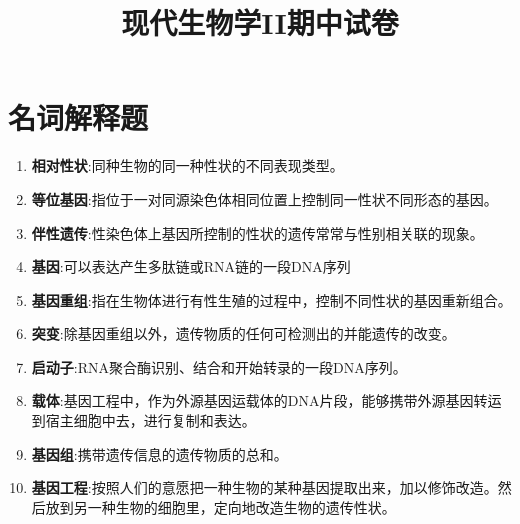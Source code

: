 \documentclass[UTF8]{article}
\title{现代生物学II期中试卷}
\begin{document}
    \maketitle
    \section{名词解释题}
    \begin{enumerate}
        \item \textbf{相对性状}:同种生物的同一种性状的不同表现类型。
        \item \textbf{等位基因}:指位于一对同源染色体相同位置上控制同一性状不同形态的基因。
        \item \textbf{伴性遗传}:性染色体上基因所控制的性状的遗传常常与性别相关联的现象。
        \item \textbf{基因}:可以表达产生多肽链或RNA链的一段DNA序列
        \item \textbf{基因重组}:指在生物体进行有性生殖的过程中，控制不同性状的基因重新组合。
        \item \textbf{突变}:除基因重组以外，遗传物质的任何可检测出的并能遗传的改变。
        \item \textbf{启动子}:RNA聚合酶识别、结合和开始转录的一段DNA序列。
        \item \textbf{载体}:基因工程中，作为外源基因运载体的DNA片段，能够携带外源基因转运到宿主细胞中去，进行复制和表达。
        \item \textbf{基因组}:携带遗传信息的遗传物质的总和。
        \item \textbf{基因工程}:按照人们的意愿把一种生物的某种基因提取出来，加以修饰改造。然后放到另一种生物的细胞里，定向地改造生物的遗传性状。
    \end{enumerate}
\end{document}
